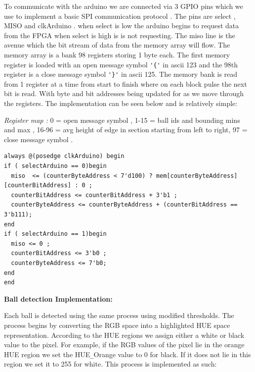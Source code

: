 \documentclass[10pt,twoside]{article}
\begin{document}
To communicate with the arduino we are connected via 3 GPIO pins which we use to implement a basic SPI communication protocol  . The pins are select , MISO and clkArduino . when select is low the arduino begins to request data from the FPGA when select is high is is not requesting. The miso line is the avenue which the bit stream of data from the memory array will flow. The memory array is a bank 98 registers storing 1 byte each. The first memory register is loaded with an open message symbol \verb|'{'| in ascii 123 and the 98th register is a close message symbol \verb|'}'| in ascii 125. The memory bank is read from 1 register at a time from start to finish where on each block pulse the next bit is read. With byte and bit addresses being updated for as we move through the registers. The implementation can be seen below and is relatively simple: 

\textit{Register map :} 0 = open message symbol , 1-15 = ball ids and bounding mins and max , 16-96 = avg height of edge in section starting from left to right, 97 = close message symbol . 

\begin{verbatim}
always @(posedge clkArduino) begin
if ( selectArduino == 0)begin
  miso  <= (counterByteAddress < 7'd100) ? mem[counterByteAddress][counterBitAddress] : 0 ;
  counterBitAddress <= counterBitAddress + 3'b1 ;
  counterByteAddress <= counterByteAddress + (counterBitAddress == 3'b111);
end    
if ( selectArduino == 1)begin
  miso <= 0 ;
  counterBitAddress <= 3'b0 ;
  counterByteAddress <= 7'b0;
end
end

\end{verbatim}

\newpage

\textbf{Ball detection Implementation:}

Each ball is detected using the same process using modified thresholds. The process begins by converting the RGB space into a highlighted HUE space representation. According to the HUE regions we assign either a white or black value to the pixel. For example, if the RGB values of the pixel lie in the orange HUE region we set the HUE\verb|_|Orange value to 0 for black. If it does not lie in this region we set it to 255 for white. This process is implemented as such:
\end{document}
